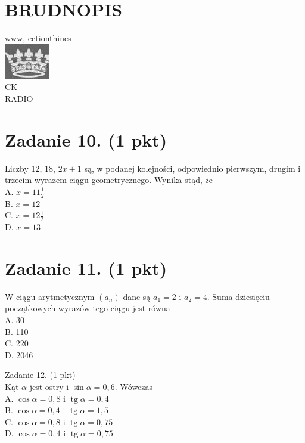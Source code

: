 \documentclass[10pt]{article}
\begin{document}
\section*{BRUDNOPIS}
www, ectionthines\\
\includegraphics[max width=\textwidth, center]{2024_11_21_2c2c97b7feae6d70b078g-03}\\
CK\\
RADIO

\section*{Zadanie 10. (1 pkt)}
Liczby 12, 18, \(2 x+1\) są, w podanej kolejności, odpowiednio pierwszym, drugim i trzecim wyrazem ciągu geometrycznego. Wynika stąd, że\\
A. \(x=11 \frac{1}{2}\)\\
B. \(x=12\)\\
C. \(x=12 \frac{1}{2}\)\\
D. \(x=13\)

\section*{Zadanie 11. (1 pkt)}
W ciągu arytmetycznym \(\left(a_{n}\right)\) dane są \(a_{1}=2\) i \(a_{2}=4\). Suma dziesięciu początkowych wyrazów tego ciągu jest równa\\
A. 30\\
B. 110\\
C. 220\\
D. 2046

Zadanie 12. (1 pkt)\\
Kąt \(\alpha\) jest ostry i \(\sin \alpha=0,6\). Wówczas\\
A. \(\cos \alpha=0,8\) i \(\operatorname{tg} \alpha=0,4\)\\
B. \(\cos \alpha=0,4\) i \(\operatorname{tg} \alpha=1,5\)\\
C. \(\cos \alpha=0,8\) i \(\operatorname{tg} \alpha=0,75\)\\
D. \(\cos \alpha=0,4\) i \(\operatorname{tg} \alpha=0,75\)
\end{document}
